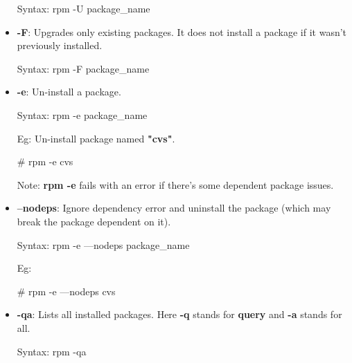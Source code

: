 \begin{flushleft}
\begin{itemize}
\begin{tcolorbox}[breakable,notitle,boxrule=-0pt,colback=pink,colframe=pink]
			Syntax: rpm -U package\_name
			\font=4pt
		\end{tcolorbox}
		\bigskip
		\bigskip
		\item \textbf{-F}: Upgrades only existing packages. It does not install a package if it wasn't previously installed.
		\begin{tcolorbox}[breakable,notitle,boxrule=-0pt,colback=pink,colframe=pink]
			\color{black}
			\font=9pt
			Syntax: rpm -F package\_name
			\font=4pt
		\end{tcolorbox}
		\bigskip
		\bigskip
		\item \textbf{-e}: Un-install a package.
		\begin{tcolorbox}[breakable,notitle,boxrule=-0pt,colback=pink,colframe=pink]
			\color{black}
			\font=9pt
			Syntax: rpm -e package\_name
			\font=4pt
		\end{tcolorbox}
		Eg: Un-install package named \textbf{"cvs"}.
		\bigskip
		\begin{tcolorbox}[breakable,notitle,boxrule=-0pt,colback=black,colframe=black]
			\color{white}
			\font=9pt
			\color{green}
			\# rpm -e cvs
			\font=4pt
		\end{tcolorbox}
		\bigskip
		\begin{tcolorbox}[breakable,notitle,boxrule=-0pt,colback=yellow,colframe=yellow]
			\color{black}
			\font=9pt
			Note: \textbf{rpm -e} fails with an error if there's some dependent package issues.
			\font=4pt
		\end{tcolorbox}
	
		\bigskip
		\bigskip
		\item \textbf{--nodeps}: Ignore dependency error and uninstall the package (which may break the package dependent on it).
		\bigskip
		\begin{tcolorbox}[breakable,notitle,boxrule=-0pt,colback=pink,colframe=pink]
			\color{black}
			\font=9pt
			Syntax: rpm -e ---nodeps package\_name
			\font=4pt
		\end{tcolorbox}
		
		Eg: 
		\bigskip
		\begin{tcolorbox}[breakable,notitle,boxrule=-0pt,colback=black,colframe=black]
			\color{white}
			\font=9pt
			\color{green}
			\# rpm -e ---nodeps cvs
			\font=4pt
		\end{tcolorbox}
		
		\bigskip
		\bigskip
		\item \textbf{-qa}: Lists all installed packages. Here \textbf{-q} stands for \textbf{query} and \textbf{-a} stands for all.
		\bigskip
		\begin{tcolorbox}[breakable,notitle,boxrule=-0pt,colback=pink,colframe=pink]
			\color{black}
			\font=9pt
			Syntax: rpm -qa
			\font=4pt
		\end{tcolorbox}
		

\end{itemize}
\end{flushleft}
